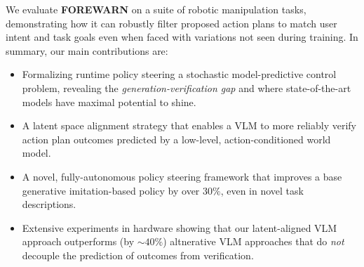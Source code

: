 We evaluate \textbf{FOREWARN} on a suite of robotic manipulation tasks, demonstrating how it can robustly filter proposed action plans to match user intent and task goals even when faced with variations not seen during training. In summary, our main contributions are:
\begin{itemize}
    \item Formalizing runtime policy steering a stochastic model-predictive control problem, revealing the \textit{generation-verification gap} \citep{Godel, cook2023complexity} and where state-of-the-art models have maximal potential to shine. 
    \item A latent space alignment strategy that enables a VLM to more reliably verify action plan outcomes predicted by a low-level, action-conditioned world model. 
    \item A novel, fully-autonomous policy steering framework that improves a base generative imitation-based policy by over $30\%$, even in novel task descriptions. 
    \item Extensive experiments in hardware showing that our latent-aligned VLM approach outperforms (by $\sim40\%$) altnerative VLM approaches that do \textit{not} decouple the prediction of outcomes from verification. 
\end{itemize}

